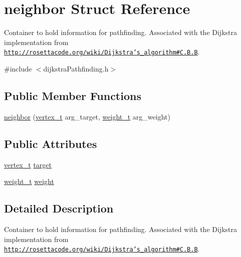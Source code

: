 \hypertarget{structneighbor}{\section{neighbor Struct Reference}
\label{structneighbor}
}


Container to hold information for pathfinding. Associated with the Dijkstra implementation from \href{http://rosettacode.org/wiki/Dijkstra's_algorithm#C.2B.2B}{\tt http\-://rosettacode.\-org/wiki/\-Dijkstra's\-\_\-algorithm\#\-C.\-B.\-B}.  




{\ttfamily \#include $<$dijkstra\-Pathfinding.\-h$>$}

\subsection*{Public Member Functions}
\begin{DoxyCompactItemize}
\item 
\hyperlink{structneighbor_a3e4e837c91b691f052f3c9a893da9964}{neighbor} (\hyperlink{dijkstraPathfinding_8h_af4d7cdf2478501dc15b627a84f3f4073}{vertex\-\_\-t} arg\-\_\-target, \hyperlink{dijkstraPathfinding_8h_ac7889bf9b3596f63c57011af217212dd}{weight\-\_\-t} arg\-\_\-weight)
\end{DoxyCompactItemize}
\subsection*{Public Attributes}
\begin{DoxyCompactItemize}
\item 
\hyperlink{dijkstraPathfinding_8h_af4d7cdf2478501dc15b627a84f3f4073}{vertex\-\_\-t} \hyperlink{structneighbor_a4c9971ec0e6f3f91702b744491995bc9}{target}
\item 
\hyperlink{dijkstraPathfinding_8h_ac7889bf9b3596f63c57011af217212dd}{weight\-\_\-t} \hyperlink{structneighbor_ae63aded0f073642ea15855846acf92c8}{weight}
\end{DoxyCompactItemize}


\subsection{Detailed Description}
Container to hold information for pathfinding. Associated with the Dijkstra implementation from \href{http://rosettacode.org/wiki/Dijkstra's_algorithm#C.2B.2B}{\tt http\-://rosettacode.\-org/wiki/\-Dijkstra's\-\_\-algorithm\#\-C.\-B.\-B}. 

